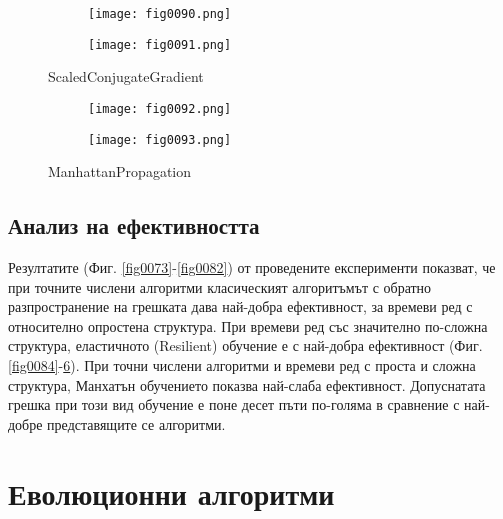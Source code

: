 \begin{figure}[H]
  \begin{subfigure}{0.49\textwidth}
  \texttt{[image: fig0090.png]}
  \label{fig0090}
  \end{subfigure}
  \begin{subfigure}{0.49\textwidth}
  \texttt{[image: fig0091.png]}
  \label{fig0091}
  \end{subfigure}
  \caption{ScaledConjugateGradient}
\end{figure}

\begin{figure}[H]
  \begin{subfigure}{0.49\textwidth}
  \texttt{[image: fig0092.png]}
  \label{fig0092}
  \end{subfigure}
  \begin{subfigure}{0.49\textwidth}
  \texttt{[image: fig0093.png]}
  \label{fig0093}
  \end{subfigure}
  \caption{ManhattanPropagation}
\end{figure}

\subsection{Анализ на ефективността}

Резултатите (Фиг. \ref{fig0073}-\ref{fig0082}) от проведените експерименти показват, че при точните числени алгоритми класическият алгоритъмът с обратно разпространение на грешката дава най-добра ефективност, за времеви ред с относително опростена структура. При времеви ред със значително по-сложна структура, еластичното (Resilient) обучение е с най-добра ефективност (Фиг. \ref{fig0084}-\ref{fig0093}). При точни числени алгоритми и времеви ред с проста и сложна структура, Манхатън обучението показва най-слаба ефективност. Допуснатата грешка при този вид обучение е поне десет пъти по-голяма в сравнение с най-добре представящите се алгоритми. 

\section{Еволюционни алгоритми}

